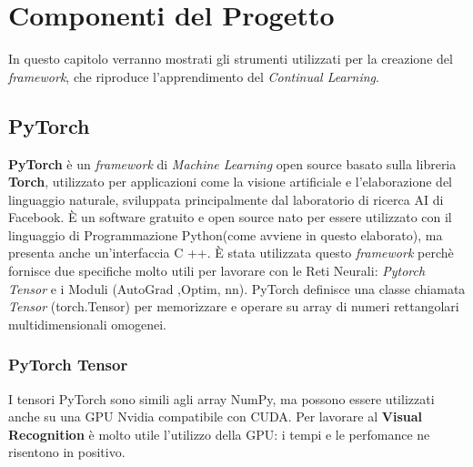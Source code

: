 \chapter{Componenti del Progetto}\label{ch:chapter2}
In questo capitolo verranno mostrati gli strumenti utilizzati per la creazione del \textit{framework}, che riproduce l'apprendimento del \textit{Continual Learning}.
\section{PyTorch}
\textbf{PyTorch} è un \textit{framework} di \textit{Machine Learning} open source basato sulla libreria \textbf{Torch}, utilizzato per applicazioni come la visione artificiale e l'elaborazione del linguaggio naturale, sviluppata principalmente dal laboratorio di ricerca AI di Facebook. È un software gratuito e open source nato  per essere utilizzato con il linguaggio di Programmazione Python(come avviene in questo elaborato), ma presenta  anche un'interfaccia C ++.
È stata utilizzata questo \textit{framework} perchè fornisce due specifiche molto utili per lavorare con le Reti Neurali: \textit{Pytorch Tensor} e i Moduli (AutoGrad ,Optim, nn).
PyTorch definisce una classe chiamata \textit{Tensor} (torch.Tensor) per memorizzare e operare su array di numeri rettangolari multidimensionali omogenei.
\newpage
\subsection{PyTorch Tensor}
I tensori PyTorch sono simili agli array NumPy, ma possono essere utilizzati anche su una GPU Nvidia compatibile con CUDA. Per lavorare al \textbf{Visual Recognition} è molto utile l'utilizzo della GPU: i tempi e le perfomance ne risentono in positivo.

